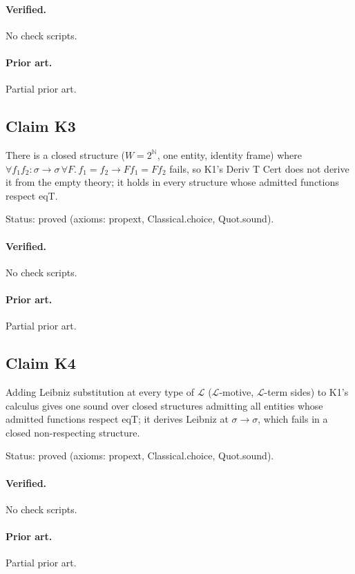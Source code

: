 \documentclass{article}
\begin{document}
\paragraph{Verified.}
No check scripts.

\paragraph{Prior art.} Partial prior art.

\subsection*{Claim K3}

There is a closed structure ($W=2^{\mathbb N}$, one entity, identity frame) where $\forall f_1f_2{:}\sigma\to\sigma\,\forall F.\,f_1=f_2\to Ff_1=Ff_2$ fails, so K1's Deriv T Cert does not derive it from the empty theory; it holds in every structure whose admitted functions respect eqT.

Status: proved (axioms: propext, Classical.choice, Quot.sound).

\paragraph{Verified.}
No check scripts.

\paragraph{Prior art.} Partial prior art.

\subsection*{Claim K4}

Adding Leibniz substitution at every type of $\mathcal L$ ($\mathcal{L}$-motive, $\mathcal{L}$-term sides) to K1's calculus gives one sound over closed structures admitting all entities whose admitted functions respect eqT; it derives Leibniz at $\sigma\to\sigma$, which fails in a closed non-respecting structure.

Status: proved (axioms: propext, Classical.choice, Quot.sound).

\paragraph{Verified.}
No check scripts.

\paragraph{Prior art.} Partial prior art.
\end{document}
